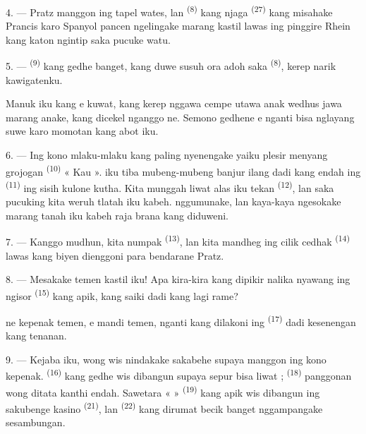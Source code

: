 4. --- Pratz manggon ing tapel wates, lan 
\textsuperscript{(8)} kang njaga  \textsuperscript{(27)}
kang misahake Prancis karo Spanyol pancen ngelingake marang kastil
lawas ing pinggire Rhein kang katon ngintip  saka pucuke
watu.

5. ---  \textsuperscript{(9)} kang gedhe banget,
kang duwe susuh ora adoh saka  \textsuperscript{(8)},
kerep narik kawigatenku.

Manuk iku  kang e kuwat, kang
kerep nggawa cempe utawa anak wedhus jawa marang anake, kang dicekel
nganggo ne. Semono gedhene e nganti bisa
nglayang suwe karo momotan kang abot iku.

\VUsaut{3.0mm}
\VUsaut{3.0mm}

6. --- Ing kono mlaku-mlaku kang paling nyenengake yaiku plesir menyang
grojogan \textsuperscript{(10)} « Kau ».  iku tiba
mubeng-mubeng banjur ilang dadi  kang endah ing
 \textsuperscript{(11)} ing sisih kulone kutha. Kita
munggah liwat alas iku tekan 
\textsuperscript{(12)}, lan saka pucuking 
kita weruh  tlatah iku kabeh. 
nggumunake, lan  kaya-kaya ngesokake marang tanah iku
kabeh raja brana kang diduweni.

7. --- Kanggo mudhun, kita numpak 
\textsuperscript{(13)}, lan kita mandheg ing  cilik
cedhak  \textsuperscript{(14)} 
lawas kang biyen dienggoni para bendarane Pratz.

8. --- Mesakake temen kastil iku! Apa kira-kira kang dipikir nalika
nyawang ing ngisor  \textsuperscript{(15)} kang apik,
kang saiki dadi  kang lagi rame?

ne kepenak temen, e mandi temen,
nganti  kang dilakoni ing 
\textsuperscript{(17)} dadi kesenengan kang tenanan.

\VUsaut{3.0mm}
\VUsaut{3.0mm}

9. --- Kejaba iku, wong wis nindakake sakabehe supaya manggon ing kono
kepenak.  \textsuperscript{(16)} kang gedhe wis
dibangun supaya sepur bisa liwat ; 
\textsuperscript{(18)}  panggonan wong
 ditata kanthi endah. Sawetara
«  » \textsuperscript{(19)} kang apik wis dibangun ing
sakubenge kasino \textsuperscript{(21)}, lan 
\textsuperscript{(22)} kang dirumat becik banget nggampangake
sesambungan.

